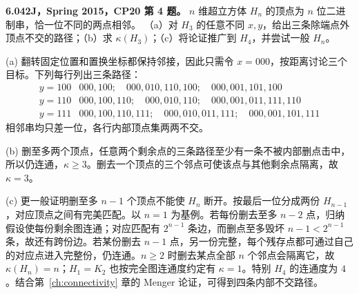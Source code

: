\begin{exercise}\label{mit:6042-cp20-q4}
\textbf{6.042J，Spring 2015，CP20 第 4 题。}
$n$ 维超立方体 $H_n$ 的顶点为 $n$ 位二进制串，恰一位不同的两点相邻。
（a）对 $H_3$ 的任意不同 $x,y$，给出三条除端点外顶点不交的路径；（b）求 $\kappa(H_3)$；（c）将论证推广到 $H_4$，并尝试一般 $H_n$。
\end{exercise}
\begin{solution}
(a) 翻转固定位置和置换坐标都保持邻接，因此只需令 $x=000$，按距离讨论三个目标。下列每行列出三条路径：
\[
\begin{array}{c|l}
y=100&000,100;\quad000,010,110,100;\quad000,001,101,100\\
y=110&000,100,110;\quad000,010,110;\quad000,001,011,111,110\\
y=111&000,100,110,111;\quad000,010,011,111;\quad000,001,101,111
\end{array}
\]
相邻串均只差一位，各行内部顶点集两两不交。

(b) 删至多两个顶点，任意两个剩余点的三条路径至少有一条不被内部删点击中，所以仍连通，$\kappa\ge3$。删去一个顶点的三个邻点可使该点与其他剩余点隔离，故 $\kappa=3$。

(c) 更一般证明删至多 $n-1$ 个顶点不能使 $H_n$ 断开。按最后一位分成两份 $H_{n-1}$，对应顶点之间有完美匹配。以 $n=1$ 为基例。若每份删去至多 $n-2$ 点，归纳假设使每份剩余图连通；对应匹配有 $2^{n-1}$ 条边，而删点至多毁坏 $n-1<2^{n-1}$ 条，故还有跨份边。若某份删去 $n-1$ 点，另一份完整，每个残存点都可通过自己的对应点进入完整份，仍连通。$n\ge2$ 时删去某点全部 $n$ 个邻点会隔离它，故 $\kappa(H_n)=n$；$H_1=K_2$ 也按完全图连通度约定有 $\kappa=1$。特别 $H_4$ 的连通度为 $4$。结合第~\ref{ch:connectivity} 章的 Menger 论证，可得到四条内部不交路径。
\end{solution}

